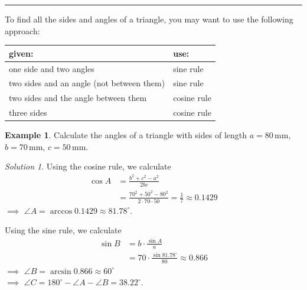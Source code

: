 \documentclass[
  english,
  12pt,
  oneside]{book}
\newcounter{none} %
\theoremstyle{definition}
\theoremstyle{definition}
\newtheorem{example}{Example}[chapter]
\theoremstyle{definition}
\theoremstyle{definition}
\theoremstyle{remark}
\newtheorem*{solution}{Solution}
\begin{document}
\begin{center}\rule{0.5\linewidth}{0.5pt}\end{center}

To find all the sides and angles of a triangle, you may want to use the following approach:

{\def\LTcaptype{none} %
\begin{longtable}[]{@{}
  >{\raggedright\arraybackslash}p{}
  >{\raggedright\arraybackslash}p{}@{}}
\toprule\noalign{}
\begin{minipage}[b]{\linewidth}\raggedright
given:
\end{minipage} & \begin{minipage}[b]{\linewidth}\raggedright
use:
\end{minipage} \\
\midrule\noalign{}
\endhead
\bottomrule\noalign{}
\endlastfoot
one side and two angles & sine rule \\
two sides and an angle (not between them) & sine rule \\
two sides and the angle between them & cosine rule \\
three sides & cosine rule \\
\end{longtable}
}

\begin{example}
Calculate the angles of a triangle with sides of length \(a=80\,\mathrm{mm}\), \(b=70\,\mathrm{mm}\), \(c=50\,\mathrm{mm}\).
\end{example}

\begin{solution}
Using the cosine rule, we calculate
\begin{align*}
\cos A &= \frac{b^2+c^2-a^2}{2bc}\\
&= \frac{70^2+50^2-80^2}{2\cdot70\cdot50} =\frac{1}{7} \approx 0.1429
\end{align*}
\(\implies\) \(\angle A = \arccos 0.1429 \approx 81.78^\circ\).

Using the sine rule, we calculate
\begin{align*}
\sin B &= b\cdot \frac{\sin A}{a}\\
&= 70 \cdot \frac{\sin 81.78^\circ}{80} \approx 0.866
\end{align*}
\(\implies\) \(\angle B=\arcsin 0.866 \approx 60^\circ\)\\
\(\implies\) \(\angle C = 180^\circ-\angle A-\angle B= 38.22^\circ\).
\end{solution}
\end{document}
